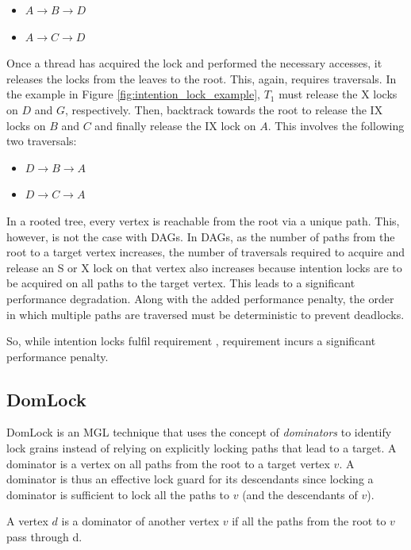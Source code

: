 \begin{itemize}
    \item $A \rightarrow B \rightarrow D$
    \item $A \rightarrow C \rightarrow D$
\end{itemize}

Once a thread has acquired the lock and performed the necessary accesses, it releases the locks from the leaves to the root. This, again, requires traversals. In the example in Figure \ref{fig:intention_lock_example}, $T_1$ must release the X locks on $D$ and $G$, respectively. Then, backtrack towards the root to release the IX locks on $B$ and $C$ and finally release the IX lock on $A$. This involves the following two traversals:

\begin{itemize}
    \item $D \rightarrow B \rightarrow A$
    \item $D \rightarrow C \rightarrow A$
\end{itemize}




In a rooted tree, every vertex is reachable from the root via a unique path. 
This, however, is not the case with DAGs.
In DAGs, as the number of paths from the root to a target vertex increases, the number of traversals required to acquire and release an S or X lock on that vertex also increases because intention locks are to be acquired on all paths to the target vertex.
This leads to a significant performance degradation. Along with the added performance penalty, the order in which multiple paths are traversed must be deterministic to prevent deadlocks.  

So, while intention locks fulfil requirement \Rb, requirement \Rc incurs a significant performance penalty. 

\subsection{DomLock}
DomLock \cite{kalikar2016domlock} is an MGL technique that uses the concept of \emph{dominators} to identify lock grains instead of relying on explicitly locking paths that lead to a target. A dominator is a vertex on all paths from the root to a target vertex $v$. A dominator is thus an effective lock guard for its descendants since locking a dominator is sufficient to lock all the paths to $v$ (and the descendants of $v$).

\begin{definition}[Dominator]
    A vertex $d$ is a dominator of another vertex $v$ if all the paths from the root to $v$ pass through d.
\end{definition}

